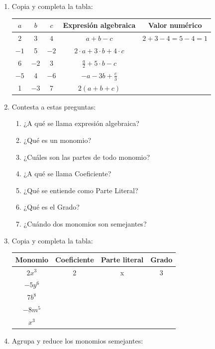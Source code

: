 \documentclass[10pt,twoside]{article}
\begin{document}
\begin{enumerate}
\item Copia y completa la tabla:
\begin{center}
\begin{tabular}{|c|c|c|c|c|}
\hline 
$a$ & $b$ & $c$ & Expresi\'on algebraica & Valor numérico \\ 
\hline 
$2$ & $3$ & $4$ & $a+b-c$ & $2+3-4=5-4=1$ \\ 
\hline 
$-1$ & 5 & $-2$ & $2\cdot a+3\cdot b +4\cdot c$ &  \\ 
\hline 
6 & $-2$ & 3 & $\frac{a}{2}+5\cdot b-c$ &  \\ 
\hline 
$-5$ & 4 & $-6$ & $-a-3b+\frac{c}{3}$ &  \\ 
\hline 
1 & $-3$ & 7 & $2(a+b+c)$ &  \\ 
\hline 
\end{tabular} 
\end{center}
\item Contesta a estas preguntas:
\begin{enumerate}
\item ¿A qué se llama expresión algebraica?
\item ¿Qué es un monomio?
\item ¿Cuáles son las partes de todo monomio?
\item ¿A qué se llama Coeficiente?
\item ¿Qué se entiende como Parte Literal?
\item ¿Qué es el Grado?
\item ¿Cuándo dos monomios son semejantes?
\end{enumerate}
\item Copia y completa la tabla:
\begin{center}
\begin{tabular}{|c|c|c|c|}
\hline 
Monomio & Coeficiente & Parte literal & Grado \\ 
\hline 
$2x^{3}$ & 2 & x & 3 \\ 
\hline 
$-5y^{6}$ &  &  &  \\ 
\hline 
$7b^{8}$ &  &  &  \\ 
\hline 
$-8m^{5}$ &  &  &  \\ 
\hline 
$x^{3}$ &  &  &  \\ 
\hline 
\end{tabular} 
\end{center}
\item Agrupa y reduce los monomios semejantes:
\begin{enumerate}
\end{enumerate}
\end{enumerate}
\end{document}
